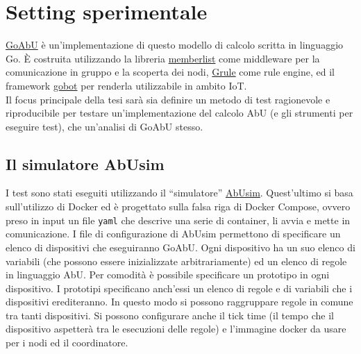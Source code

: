 \documentclass[12pt, a4paper]{article}
\begin{document}
\section{Setting sperimentale}\label{setting}

\href{https://github.com/abu-lang/goabu}{GoAbU} è un'implementazione di questo modello di calcolo scritta in linguaggio Go.
È costruita utilizzando la libreria \href{https://github.com/hashicorp/memberlist}{memberlist} come middleware per la comunicazione in gruppo e la scoperta dei nodi,  \href{https://github.com/hyperjumptech/grule-rule-engine}{Grule} come rule engine, ed il framework \href{https://github.com/hybridgroup/gobot/}{gobot} per renderla utilizzabile in ambito IoT.\\
Il focus principale della tesi sarà sia definire un metodo di test ragionevole e riproducibile per testare un'implementazione del calcolo AbU (e gli strumenti per eseguire test), che un'analisi di GoAbU stesso.

\subsection{Il simulatore AbUsim}\label{setting:abusim}

I test sono stati eseguiti utilizzando il ``simulatore'' \href{https://github.com/abu-lang/abusim}{AbUsim}. Quest'ultimo si basa sull'utilizzo di Docker ed è progettato sulla falsa riga di Docker Compose, ovvero preso in input un file \lstinline{yaml} che descrive una serie di container, li avvia e mette in comunicazione.
I file di configurazione di AbUsim permettono di specificare un elenco di dispositivi che eseguiranno GoAbU. Ogni dispositivo ha un suo elenco di variabili (che possono essere inizializzate arbitrariamente) ed un elenco di regole in linguaggio AbU.
Per comodità è possibile specificare un prototipo in ogni dispositivo. I prototipi specificano anch'essi un elenco di regole e di variabili che i dispositivi erediteranno. In questo modo si possono raggruppare regole in comune tra tanti dispositivi.
Si possono configurare anche il tick time (il tempo che il dispositivo aspetterà tra le esecuzioni delle regole) e l'immagine docker da usare per i nodi ed il coordinatore.
\end{document}
